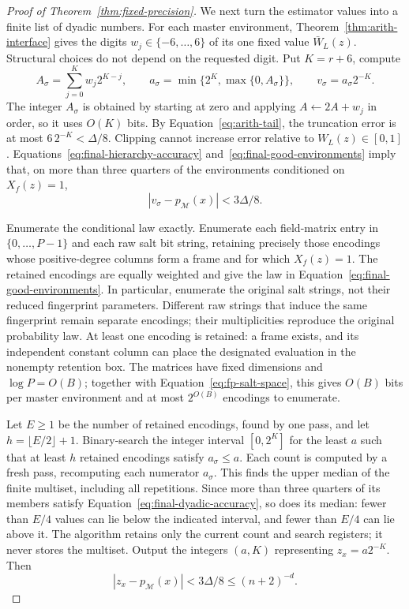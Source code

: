 \begin{proof}[Proof of Theorem~\ref{thm:fixed-precision}]
We next turn the estimator values into a finite list of dyadic numbers.
For each master environment, Theorem~\ref{thm:arith-interface}
gives the digits $w_j\in\{-6,\ldots,6\}$ of its one fixed value
$\bar W_L(z)$. Structural choices do not depend on the requested
digit. Put $K=r+6$, compute
\[
 A_\sigma=\sum_{j=0}^{K}w_j2^{K-j},\qquad
 a_\sigma=\min\{2^K,\max\{0,A_\sigma\}\},\qquad
 v_\sigma=a_\sigma2^{-K}.
\]
The integer $A_\sigma$ is obtained by starting at zero and applying
$A\leftarrow2A+w_j$ in order, so it uses $O(K)$ bits.
By Equation~\eqref{eq:arith-tail}, the truncation error is at most
$6\,2^{-K}<\Delta/8$. Clipping cannot increase error relative to
$W_L(z)\in[0,1]$. Equations~\eqref{eq:final-hierarchy-accuracy}
and~\eqref{eq:final-good-environments} imply that, on more than
three quarters of the environments conditioned on $X_f(z)=1$,
\begin{equation}\label{eq:final-dyadic-accuracy}
 |v_\sigma-p_{\mathcal M}(x)|<3\Delta/8.
\end{equation}

Enumerate the conditional law exactly. Enumerate each field-matrix
entry in $\{0,\ldots,P-1\}$ and each raw salt bit string, retaining
precisely those encodings whose positive-degree columns form a frame
and for which $X_f(z)=1$. The retained encodings are equally weighted
and give the law in Equation~\eqref{eq:final-good-environments}.
In particular, enumerate the original salt strings, not their reduced
fingerprint parameters. Different raw strings that induce the same
fingerprint remain separate encodings; their multiplicities reproduce
the original probability law. At least one encoding is retained: a frame
exists, and its independent constant column can place the designated
evaluation in the nonempty retention box. The matrices have fixed
dimensions and $\log P=O(B)$; together with
Equation~\eqref{eq:fp-salt-space}, this gives $O(B)$ bits per master
environment and at most $2^{O(B)}$ encodings to enumerate.

Let $E\ge1$ be the number of retained encodings, found by one pass,
and let $h=\lfloor E/2\rfloor+1$. Binary-search the integer interval
$[0,2^K]$ for the least $a$ such that at least $h$ retained encodings
satisfy $a_\sigma\le a$. Each count is computed by a fresh pass,
recomputing each numerator $a_\sigma$. This finds the upper median
of the finite multiset, including all repetitions. Since more than
three quarters of its members satisfy
Equation~\eqref{eq:final-dyadic-accuracy}, so does its median: fewer than
$E/4$ values can lie below the indicated interval, and fewer than
$E/4$ can lie above it. The algorithm retains only the current count
and search registers; it never stores the multiset.
Output the integers $(a,K)$ representing $z_x=a2^{-K}$. Then
\[
 |z_x-p_{\mathcal M}(x)|<3\Delta/8
       \le(n+2)^{-d}.
\]


\end{proof}

